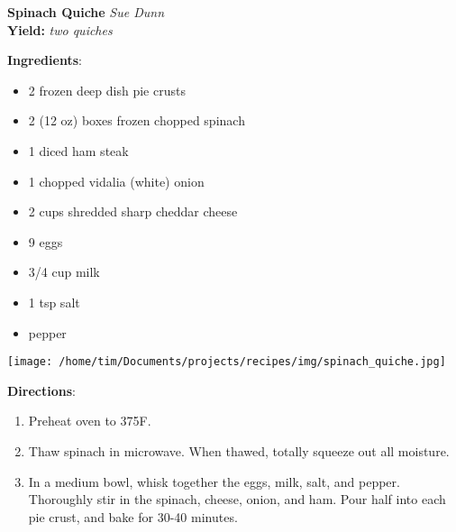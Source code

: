 \documentclass[11pt, twoside, openany]{book}
\begin{document}
\noindent\begin{minipage}[t]{\linewidth}%
{\Large\textbf{Spinach Quiche}} \label{spinach-quiche}\hfill\textit{Sue Dunn}\\
\textbf{Yield:} \textit{two quiches}\\
\noindent\begin{minipage}[t]{0.78\linewidth}%
\textbf{Ingredients}:\vspace{-3mm}
\begin{multicols}{2}
\begin{itemize}\setlength\itemsep{-1mm}
\item 2 frozen deep dish pie crusts
\item 2 (12 oz) boxes frozen chopped spinach
\item 1 diced ham steak
\item 1 chopped vidalia (white) onion
\item 2 cups shredded sharp cheddar cheese
\item 9 eggs
\item 3/4 cup milk
\item 1 tsp salt
\item pepper
\end{itemize}
\end{multicols}
\end{minipage}
\noindent\begin{minipage}[t]{0.18\linewidth}
\centering \strut\vspace*{-\baselineskip}\newline
\texttt{[image: /home/tim/Documents/projects/recipes/img/spinach\_quiche.jpg]}\\
\end{minipage}\vspace{3mm}
\textbf{Directions}:
\vspace{-3mm}\begin{enumerate}\setlength\itemsep{-1mm}
\item Preheat oven to 375F.
\item Thaw spinach in microwave. When thawed, totally squeeze out all moisture.
\item In a medium bowl, whisk together the eggs, milk, salt, and pepper. Thoroughly stir in the spinach, cheese, onion, and ham. Pour half into each pie crust, and bake for 30-40 minutes.
\end{enumerate}
\end{minipage}\vspace{8mm}
\end{document}

